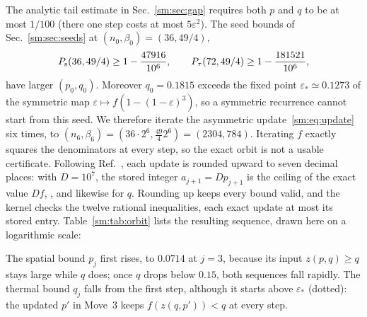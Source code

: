 The analytic tail estimate in Sec.~\ref{sm:sec:gap} requires both
$p$ and $q$ to be at most $1/100$ (there one step costs at most
$5\varepsilon^2$). The seed bounds of Sec.~\ref{sm:sec:seeds} at
$(n_0,\beta_0)=(36,49/4)$,
\begin{equation}
    P_{\mathrm s}(36,49/4)\ge1-\frac{47916}{10^6},
    \qquad
    P_{\tau}(72,49/4)\ge1-\frac{181521}{10^6},
    \label{sm:eq:initial}
\end{equation}
have larger $(p_0,q_0)$. Moreover $q_0=0.1815$ exceeds the fixed point
$\varepsilon_*\simeq0.1273$ of the symmetric map
$\varepsilon\mapsto f(1-(1-\varepsilon)^3)$, so a symmetric recurrence
cannot start from this seed. We therefore iterate the asymmetric
update~\eqref{sm:eq:update} six times, to
$(n_6,\beta_6)=(36\cdot2^6,\tfrac{49}{4}2^6)=(2304,784)$.
Iterating $f$ exactly squares the denominators at every step, so the
exact orbit is not a usable certificate. Following
Ref.~\cite{OpenAI2026Periodic}, each update is rounded upward to seven
decimal places: with $D=10^7$, the stored integer $a_{j+1}=Dp_{j+1}$
is the ceiling of the exact value $Df$, \ceilcheck, and likewise for
$q$. Rounding up keeps every bound valid, and the kernel checks the
twelve rational inequalities, each exact update at most its stored
entry.
Table~\ref{sm:tab:orbit} lists the resulting sequence, drawn here on a
logarithmic scale:
\begin{proofdiagram}
\end{proofdiagram}
The spatial bound $p_j$ first rises, to $0.0714$ at $j=3$, because its
input $z(p,q)\ge q$ stays large while $q$ does; once $q$ drops below
$0.15$, both sequences fall rapidly. The thermal bound $q_j$ falls from
the first step, although it starts above $\varepsilon_*$ (dotted): the
updated $p'$ in Move~3 keeps $f(z(q,p'))<q$ at every step.

